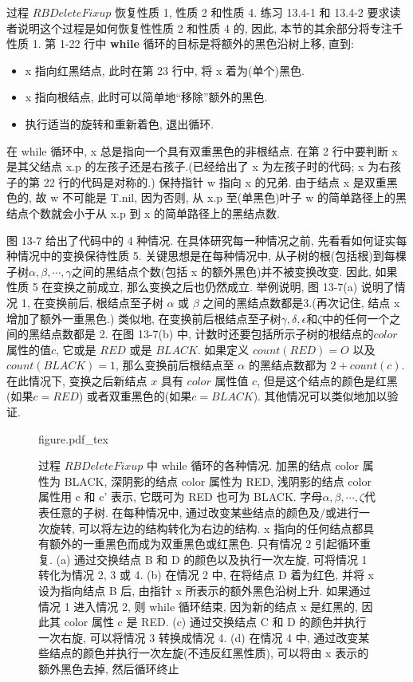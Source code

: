 \documentclass[oneside,10pt,fontset=none]{ctexbook}
\numberwithin{definition}{chapter}
\numberwithin{theorem}{chapter}
\numberwithin{lemma}{chapter}
\begin{document}
过程 $RBDeleteFixup$ 恢复性质 1, 性质 2 和性质 4. 练习 13.4-1 和 13.4-2 要求读者说明这个过程是如何恢复性性质 2 和性质 4 的, 因此, 本节的其余部分将专注千性质 1. 第 1-22 行中 \textbf{while} 循环的目标是将额外的黑色沿树上移, 直到:

\begin{itemize}
    \item x 指向红黑结点, 此时在第 23 行中, 将 x 着为(单个)黑色.
    \item x 指向根结点, 此时可以简单地``移除''额外的黑色.
    \item 执行适当的旋转和重新着色, 退出循环.
\end{itemize}

在 while 循环中, x 总是指向一个具有双重黑色的非根结点. 在第 2 行中要判断 x 是其父结点 x.p 的左孩子还是右孩子.(已经给出了 x 为左孩子时的代码; x 为右孩子的第 22 行的代码是对称的.) 保持指针 w 指向 x 的兄弟. 由于结点 x 是双重黑色的, 故 w 不可能是 T.nil, 因为否则, 从 x.p 至(单黑色)叶子 w 的简单路径上的黑结点个数就会小于从 x.p 到 x 的简单路径上的黑结点数.

图 13-7 给出了代码中的 4 种情况. 在具体研究每一种情况之前, 先看看如何证实每种情况中的变换保待性质 5. 关键思想是在每种情况中, 从子树的根(包括根)到每棵子树$\alpha, \beta, \cdots, \gamma$之间的黑结点个数(包括 x 的额外黑色)并不被变换改变. 因此, 如果性质 5 在变换之前成立, 那么变换之后也仍然成立. 举例说明, 图 13-7(a) 说明了情况 1, 在变换前后, 根结点至子树 $\alpha$ 或 $\beta$ 之间的黑结点数都是3.(再次记住, 结点 x 增加了额外一重黑色.) 类似地, 在变换前后根结点至子树$\gamma, \delta, \epsilon\text{和}\zeta$中的任何一个之间的黑结点数都是 2. 在图 13-7(b) 中, 计数时还要包括所示子树的根结点的$color$属性的值$c$, 它或是 $RED$ 或是 $BLACK$. 如果定义 $count(RED)=O$ 以及 $count(BLACK)=1$, 那么变换前后根结点至 $\alpha$ 的黑结点数都为 $2+count(c)$. 在此情况下, 变换之后新结点 $x$ 具有 $color$ 属性值 $c$, 但是这个结点的颜色是红黑(如果$c=RED$) 或者双重黑色的(如果$c=BLACK$). 其他情况可以类似地加以验证.

\begin{figure}[htbp]
    \centering
    \def\svgwidth{\columnwidth}
    {figure.pdf_tex}
    \caption{\small{过程 $RBDeleteFixup$ 中 while 循环的各种情况. 加黑的结点 color 属性为 BLACK, 深阴影的结点 color 属性为 RED, 浅阴影的结点 color 属性用 c 和 c' 表示, 它既可为 RED 也可为 BLACK. 字母$\alpha,\beta,\cdots,\zeta$代表任意的子树. 在每种情况中, 通过改变某些结点的颜色及/或进行一次旋转, 可以将左边的结构转化为右边的结构. x 指向的任何结点都具有额外的一重黑色而成为双重黑色或红黑色. 只有情况 2 引起循环重复. (a) 通过交换结点 B 和 D 的颜色以及执行一次左旋, 可将情况 1 转化为情况 2, 3 或 4. (b) 在情况 2 中, 在将结点 D 着为红色, 并将 x 设为指向结点 B 后, 由指针 x 所表示的额外黑色沿树上升. 如果通过情况 1 进入情况 2, 则 while 循环结束, 因为新的结点 x 是红黑的, 因此其 color 属性 c 是 RED. (c) 通过交换结点 C 和 D 的颜色并执行一次右旋, 可以将情况 3 转换成情况 4. (d) 在情况 4 中, 通过改变某些结点的颜色并执行一次左旋(不违反红黑性质), 可以将由 x 表示的额外黑色去掉, 然后循环终止}}
    \label{fig:红黑树删除过程修复的示意图}
\end{figure}
\end{document}
